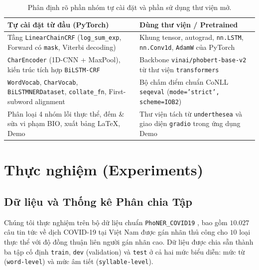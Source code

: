 \documentclass[11pt,a4paper,twocolumn]{article}
\begin{document}
\begin{table}[t]
\centering
\small
\begin{tabular}{p{3.4cm}p{3.8cm}}
\hline
\textbf{Tự cài đặt từ đầu (PyTorch)} & \textbf{Dùng thư viện / Pretrained} \\
\hline
Tầng \texttt{LinearChainCRF} (\texttt{log\_sum\_exp}, Forward có \texttt{mask}, Viterbi decoding) & Khung tensor, autograd, \texttt{nn.LSTM}, \texttt{nn.Conv1d}, \texttt{AdamW} của PyTorch \\
\hline
\texttt{CharEncoder} (1D-CNN + MaxPool), kiến trúc tích hợp \texttt{BiLSTM-CRF} & Backbone \texttt{vinai/phobert-base-v2} từ thư viện \texttt{transformers} \\
\hline
\texttt{WordVocab}, \texttt{CharVocab}, \texttt{BiLSTMNERDataset}, \texttt{collate\_fn}, First-subword alignment & Bộ chấm điểm chuẩn CoNLL \texttt{seqeval} (\texttt{mode='strict', scheme=IOB2}) \\
\hline
Phân loại 4 nhóm lỗi thực thể, đếm \& sửa vi phạm BIO, xuất bảng LaTeX, Demo & Thư viện tách từ \texttt{underthesea} và giao diện \texttt{gradio} trong ứng dụng Demo \\
\hline
\end{tabular}
\caption{Phân định rõ phần nhóm tự cài đặt và phần sử dụng thư viện mở.}
\label{tab:impl_boundary}
\end{table}

\section{Thực nghiệm (Experiments)}
\label{sec:experiments}

\subsection{Dữ liệu và Thống kê Phân chia Tập}
\label{sec:data_stats}
Chúng tôi thực nghiệm trên bộ dữ liệu chuẩn \texttt{PhoNER\_COVID19} \citep{truong-etal-2021-covid}, bao gồm $10.027$ câu tin tức về dịch COVID-19 tại Việt Nam được gán nhãn thủ công cho $10$ loại thực thể với độ đồng thuận liên người gán nhãn cao. Dữ liệu được chia sẵn thành ba tập cố định \texttt{train}, \texttt{dev} (validation) và \texttt{test} ở cả hai mức biểu diễn: mức từ (\texttt{word-level}) và mức âm tiết (\texttt{syllable-level}).
\end{document}
